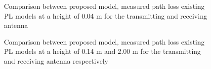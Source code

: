 \begin{figure}[H]
\centering

\caption{Comparison between proposed model, measured path loss existing PL models at a height of 0.04 m for the transmitting and receiving antenna}
\label{ourModel1}
\end{figure}

\begin{figure}[H]
\centering

\caption{Comparison between proposed model, measured path loss existing PL models at a height of 0.14 m and 2.00 m for the transmitting and receiving antenna respectively}
\label{ourModel2}
\end{figure}








     

